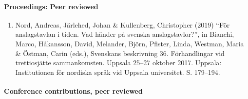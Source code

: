 \documentclass[
]{article}
\providecommand{\tightlist}{%
  \setlength{\itemsep}{0pt}\setlength{\parskip}{0pt}}
\begin{document}
\hypertarget{proceedings-peer-reviewed}{%
\paragraph{Proceedings: Peer reviewed}\label{proceedings-peer-reviewed}}

\begin{enumerate}
\def\labelenumi{\arabic{enumi}.}
\tightlist
\item
  Nord, Andreas, Järlehed, Johan \& Kullenberg, Christopher (2019) ``För
  anslagstavlan i tiden. Vad händer på svenska anslagstavlor?'', in
  Bianchi, Marco, Håkansson, David, Melander, Björn, Pfister, Linda,
  Westman, Maria \& Östman, Carin (eds.), Svenskans beskrivning 36.
  Förhandlingar vid trettiosjätte sammankomsten. Uppsala 25--27 oktober
  2017. Uppsala: Institutionen för nordiska språk vid Uppsala
  universitet. S. 179--194.
\end{enumerate}

\hypertarget{conference-contributions-peer-reviewed}{%
\paragraph{Conference contributions, peer
reviewed}\label{conference-contributions-peer-reviewed}}
\end{document}
